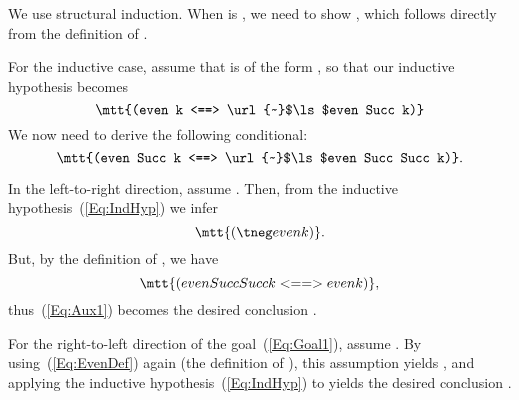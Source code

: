 %
%
We use structural induction. When  is , we need to show , which follows
directly from the definition of .

For the inductive case, assume that  is of the form , so that our inductive hypothesis becomes
\begin{equation}
\mtt{(even k <==> \url{~}$\ls$even Succ k)}
\label{Eq:IndHyp}
\end{equation}
We now need to derive the following conditional:
\begin{equation}
\mtt{(even Succ k <==> \url{~}$\ls$even Succ Succ k)}.
\label{Eq:Goal1}
\end{equation}

In the left-to-right direction, assume . Then, from the inductive hypothesis~(\ref{Eq:IndHyp})
we infer
\begin{equation}
\mtt{(\tneg even k)}.
\label{Eq:Aux1}
\end{equation}
But, by the definition of , we have
\begin{equation}
\mtt{(even Succ Succ k <==> even k)},
\label{Eq:EvenDef}
\end{equation}
thus~(\ref{Eq:Aux1}) becomes the desired conclusion .

For the right-to-left direction of the goal~(\ref{Eq:Goal1}), assume .
By using~(\ref{Eq:EvenDef}) again (the definition of ), this assumption yields
, and applying the inductive hypothesis~(\ref{Eq:IndHyp}) to
 yields the desired conclusion .
